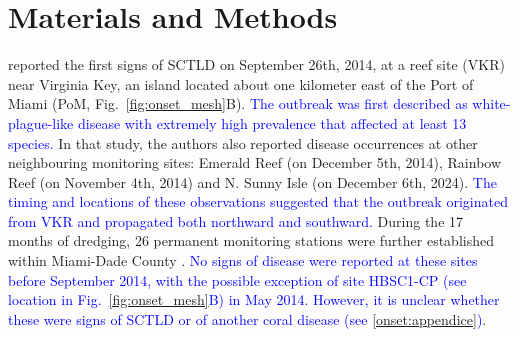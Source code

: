 \documentclass[preprint,12pt,authoryear]{elsarticle}
\newcommand{\modif}[1]{\textcolor{blue}{#1}}
\begin{document}
\section{Materials and Methods}

\cite{precht2016unprecedented} reported the first signs of SCTLD on September 26th, 2014, at a reef site (VKR) near Virginia Key, an island located about one kilometer east of the Port of Miami (PoM, Fig.~\ref{fig:onset_mesh}B). \modif{The outbreak was first described as white-plague-like disease with extremely high prevalence that affected at least 13 species.} In that study, the authors also reported disease occurrences at other neighbouring monitoring sites: Emerald Reef (on December 5th, 2014), Rainbow Reef (on November 4th, 2014) and N. Sunny Isle (on December 6th, 2024). \modif{The timing and locations of these observations suggested that the outbreak originated from VKR and propagated both northward and southward.} %
During the 17 months of dredging, 26 permanent monitoring stations were further established within Miami-Dade County \citep{gintert2019regional}. \modif{No signs of disease were reported at these sites before September 2014, with the possible exception of site HBSC1-CP (see location in Fig.~\ref{fig:onset_mesh}B) in May 2014. However, it is unclear whether these were signs of SCTLD or of another coral disease (see \ref{onset:appendice})}.
\end{document}
